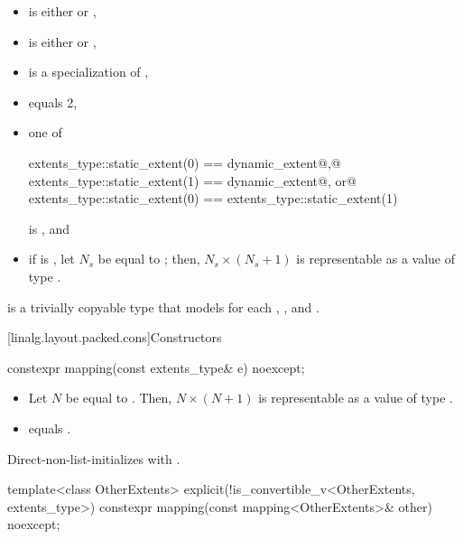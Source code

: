 \begin{itemdescr}
\pnum
\mandates
\begin{itemize}
\item
{} is either  or ,
\item
{} is either  or ,
\item
{} is a specialization of ,
\item
{} equals 2,
\item
one of
\begin{codeblock}
extents_type::static_extent(0) == dynamic_extent@\textrm{,}@
extents_type::static_extent(1) == dynamic_extent@\textrm{, or}@
extents_type::static_extent(0) == extents_type::static_extent(1)
\end{codeblock}
is , and
\item
if  is ,
let $N_s$ be equal to ; then,
$N_s \times (N_s + 1)$ is representable as a value of type .
\end{itemize}

\pnum
{} is a trivially copyable type
that models  for each , , and .
\end{itemdescr}

[linalg.layout.packed.cons]{Constructors}

%
\begin{itemdecl}
constexpr mapping(const extents_type& e) noexcept;
\end{itemdecl}

\begin{itemdescr}
\pnum
\expects
\begin{itemize}
\item
Let $N$ be equal to .
Then, $N \times (N+1)$ is representable as
a value of type .
\item
{} equals .
\end{itemize}

\pnum
\effects
Direct-non-list-initializes  with .
\end{itemdescr}

%
\begin{itemdecl}
template<class OtherExtents>
  explicit(!is_convertible_v<OtherExtents, extents_type>)
    constexpr mapping(const mapping<OtherExtents>& other) noexcept;
\end{itemdecl}

